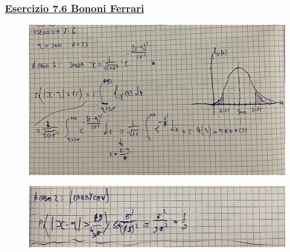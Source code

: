 \documentclass{article}
\begin{document}
\subsubsection{\underline{Esercizio 7.6 Bononi Ferrari}}
\begin{figure}[H]
\centering
\includegraphics[scale=0.10]{ese/37.jpeg}
\end{figure}
\begin{figure}[H]
\centering
\includegraphics[scale=0.10]{ese/37a.jpeg}
\end{figure}
\end{document}
